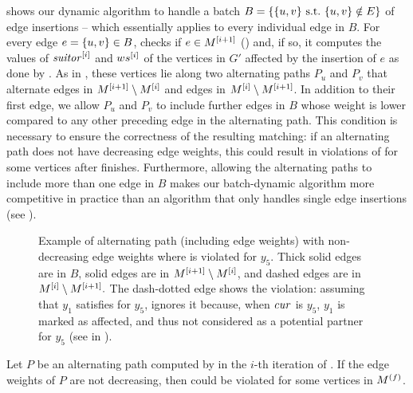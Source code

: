  shows our dynamic algorithm to handle a batch
$B = \set{\set{u, v}\ \text{s.t.}\ \set{u, v}\notin E}$ of edge insertions --
which essentially applies  to every individual
edge in $B$.
For every edge $e = \set{u, v} \in B$, 
checks if $e \in M^{[i + 1]}$ () and, if
so, it computes the values of $\mathit{suitor}^{[i]}$
and $ws^{[i]}$ of the vertices in $G'$ affected by the insertion of $e$
as done by .
As in ,
these vertices lie along two alternating paths $P_u$
and $P_v$ that alternate edges in $M^{[i + 1]} \setminus M^{[i]}$
and edges in $M^{[i]}\setminus M^{[i + 1]}$.
In addition to their first edge, we allow $P_u$ and $P_v$ to include further edges in $B$
whose weight is lower compared to any other preceding edge in the alternating path.
This condition is necessary to ensure the correctness of the resulting matching:
if an alternating path does not have decreasing edge weights, this could result in
violations of  for some vertices after
 finishes. Furthermore, allowing the
alternating paths to include more than one edge in $B$ makes our batch-dynamic
algorithm more competitive in practice than an algorithm that only handles
single edge insertions (see ).

\begin{figure}[tb]
\centering

\caption{Example of alternating path (including edge weights) with
non-decreasing edge weights where  is violated for $y_5$. Thick
solid edges are in $B$, solid edges are in $M^{[i + 1]} \setminus M^{[i]}$,
and dashed edges are in $M^{[i]}\setminus M^{[i + 1]}.$ The dash-dotted edge
shows the violation: assuming that $y_1$ satisfies  for $y_5$,
\findaff ignores it because, when $\mathit{cur}$ is $y_5$, $y_1$ is marked as affected,
and thus not considered as a potential partner for $y_5$ (see
 in ).}

\label{fig:dyn-mwm:batch-ins-decr}
\end{figure}


\begin{remark}
\label{remark:dyn-mwm:alt-path-decreasing-weights}
Let $P$ be an alternating path computed by \findaff in the $i$-th iteration
of . If the edge weights of $P$ are not
decreasing, then  could be violated for some vertices in
$M^{(f)}$.
\end{remark}

